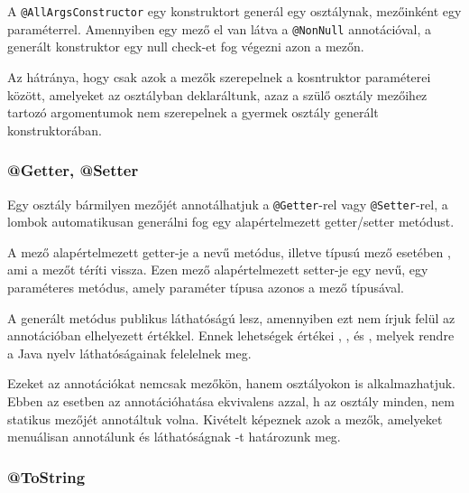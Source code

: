 A \lstinline|@AllArgsConstructor| egy konstruktort generál egy osztálynak, mezőinként egy paraméterrel. Amennyiben egy mező el van látva a \lstinline|@NonNull| annotációval, a generált konstruktor egy null check-et fog végezni azon a mezőn.


Az  hátránya, hogy csak azok a mezők szerepelnek a kosntruktor paraméterei között, amelyeket az osztályban deklaráltunk, azaz a szülő osztály mezőihez tartozó argomentumok nem szerepelnek a gyermek osztály generált konstruktorában.


\subsubsection{@Getter, @Setter}

Egy osztály bármilyen mezőjét annotálhatjuk a  \lstinline|@Getter|-rel vagy \lstinline|@Setter|-rel, a lombok automatikusan generálni fog egy alapértelmezett getter/setter metódust. \par

A  mező alapértelmezett getter-je a  nevű metódus, illetve  típusú mező esetében , ami a  mezőt téríti vissza. Ezen mező alapértelmezett setter-je egy  nevű, egy paraméteres metódus, amely paraméter típusa azonos a mező típusával. \par

A generált metódus publikus láthatóságú lesz, amennyiben ezt nem írjuk felül az annotációban elhelyezett  értékkel. Ennek lehetségek értékei , ,  és , melyek rendre a Java nyelv láthatóságainak felelelnek meg. \par

Ezeket az annotációkat nemcsak mezőkön, hanem osztályokon is alkalmazhatjuk. Ebben az esetben az annotációhatása ekvivalens azzal, h az osztály minden, nem statikus mezőjét annotáltuk volna. Kivételt képeznek azok a mezők, amelyeket menuálisan annotálunk és láthatóságnak -t határozunk meg. \par


\subsubsection{@ToString}

